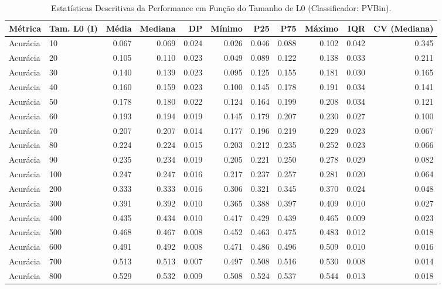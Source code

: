 \begin{table}[htbp]
\begin{table}
\caption{Estatísticas Descritivas da Performance em Função do Tamanho de L0 (Classificador: PVBin).}
\label{tab:l0_random_stats_summary}
\centering
\begin{tabular}{ll|rrrrrrr|rr}
\toprule
Métrica & Tam. L0 (I) & Média & Mediana & DP & Mínimo & P25 & P75 & Máximo & IQR & CV (Mediana) \\
\midrule
Acurácia & 10 & 0.067 & 0.069 & 0.024 & 0.026 & 0.046 & 0.088 & 0.102 & 0.042 & 0.345 \\
Acurácia & 20 & 0.105 & 0.110 & 0.023 & 0.049 & 0.089 & 0.122 & 0.138 & 0.033 & 0.211 \\
Acurácia & 30 & 0.140 & 0.139 & 0.023 & 0.095 & 0.125 & 0.155 & 0.181 & 0.030 & 0.165 \\
Acurácia & 40 & 0.160 & 0.159 & 0.023 & 0.100 & 0.145 & 0.178 & 0.191 & 0.034 & 0.141 \\
Acurácia & 50 & 0.178 & 0.180 & 0.022 & 0.124 & 0.164 & 0.199 & 0.208 & 0.034 & 0.121 \\
Acurácia & 60 & 0.193 & 0.194 & 0.019 & 0.145 & 0.179 & 0.207 & 0.230 & 0.027 & 0.100 \\
Acurácia & 70 & 0.207 & 0.207 & 0.014 & 0.177 & 0.196 & 0.219 & 0.229 & 0.023 & 0.067 \\
Acurácia & 80 & 0.224 & 0.224 & 0.015 & 0.203 & 0.212 & 0.235 & 0.252 & 0.023 & 0.066 \\
Acurácia & 90 & 0.235 & 0.234 & 0.019 & 0.205 & 0.221 & 0.250 & 0.278 & 0.029 & 0.082 \\
Acurácia & 100 & 0.247 & 0.247 & 0.016 & 0.217 & 0.237 & 0.257 & 0.281 & 0.020 & 0.064 \\
Acurácia & 200 & 0.333 & 0.333 & 0.016 & 0.306 & 0.321 & 0.345 & 0.370 & 0.024 & 0.048 \\
Acurácia & 300 & 0.391 & 0.392 & 0.010 & 0.365 & 0.388 & 0.397 & 0.409 & 0.010 & 0.027 \\
Acurácia & 400 & 0.435 & 0.434 & 0.010 & 0.417 & 0.429 & 0.439 & 0.465 & 0.009 & 0.023 \\
Acurácia & 500 & 0.468 & 0.467 & 0.008 & 0.452 & 0.463 & 0.475 & 0.483 & 0.012 & 0.018 \\
Acurácia & 600 & 0.491 & 0.492 & 0.008 & 0.471 & 0.486 & 0.496 & 0.509 & 0.010 & 0.016 \\
Acurácia & 700 & 0.513 & 0.513 & 0.007 & 0.497 & 0.508 & 0.516 & 0.530 & 0.008 & 0.014 \\
Acurácia & 800 & 0.529 & 0.532 & 0.009 & 0.508 & 0.524 & 0.537 & 0.544 & 0.013 & 0.018 \\

\end{tabular}
\end{table}
\end{table}

